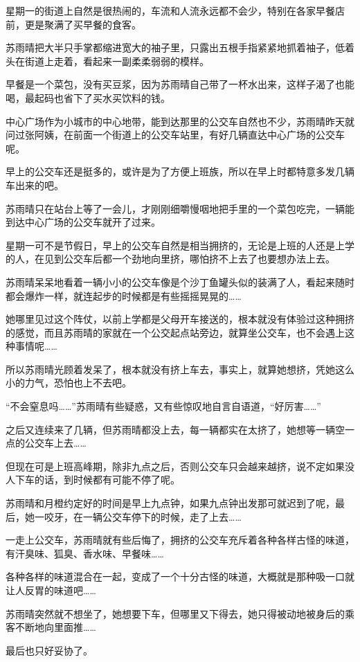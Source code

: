 星期一的街道上自然是很热闹的，车流和人流永远都不会少，特别在各家早餐店前，更是聚满了买早餐的食客。

苏雨晴把大半只手掌都缩进宽大的袖子里，只露出五根手指紧紧地抓着袖子，低着头在街道上走着，看起来一副柔柔弱弱的模样。

早餐是一个菜包，没有买豆浆，因为苏雨晴自己带了一杯水出来，这样子渴了也能喝，最起码也省下了买水买饮料的钱。

中心广场作为小城市的中心地带，能到达那里的公交车自然也不少，苏雨晴昨天就问过张阿姨，在前面一个街道上的公交车站里，有好几辆直达中心广场的公交车呢。

早上的公交车还是挺多的，或许是为了方便上班族，所以在早上时都特意多发几辆车出来的吧。

苏雨晴只在站台上等了一会儿，才刚刚细嚼慢咽地把手里的一个菜包吃完，一辆能到达中心广场的公交车就开了过来。

星期一可不是节假日，早上的公交车自然是相当拥挤的，无论是上班的人还是上学的人，在见到公交车后都一个劲地向里挤，哪怕挤不上去了也要想办法上去。

苏雨晴呆呆地看着一辆小小的公交车像是个沙丁鱼罐头似的装满了人，看起来随时都会爆炸一样，就连起步的时候都是有些摇摇晃晃的……

她哪里见过这个阵仗，以前上学都是父母开车接送的，根本就没有体验过这种拥挤的感觉，而且苏雨晴的家就在一个公交起点站旁边，就算坐公交车，也不会遇上这种事情呢……

所以苏雨晴光顾着发呆了，根本就没有挤上车去，事实上，就算她想挤，凭她这么小的力气，恐怕也上不去吧。

“不会窒息吗……”苏雨晴有些疑惑，又有些惊叹地自言自语道，“好厉害……”

之后又连续来了几辆，但苏雨晴都没上去，每一辆都实在太挤了，她想等一辆空一点的公交车上去……

但现在可是上班高峰期，除非九点之后，否则公交车只会越来越挤，说不定如果没人下车的话，到时候都有可能不停了呢。

苏雨晴和月橙约定好的时间是早上九点钟，如果九点钟出发那可就迟到了呢，最后，她一咬牙，在一辆公交车停下的时候，走了上去……

一走上公交车，苏雨晴就有些后悔了，拥挤的公交车充斥着各种各样古怪的味道，有汗臭味、狐臭、香水味、早餐味……

各种各样的味道混合在一起，变成了一个十分古怪的味道，大概就是那种吸一口就让人反胃的味道吧……

苏雨晴突然就不想坐了，她想要下车，但哪里又下得去，她只得被动地被身后的乘客不断地向里面推……

最后也只好妥协了。

